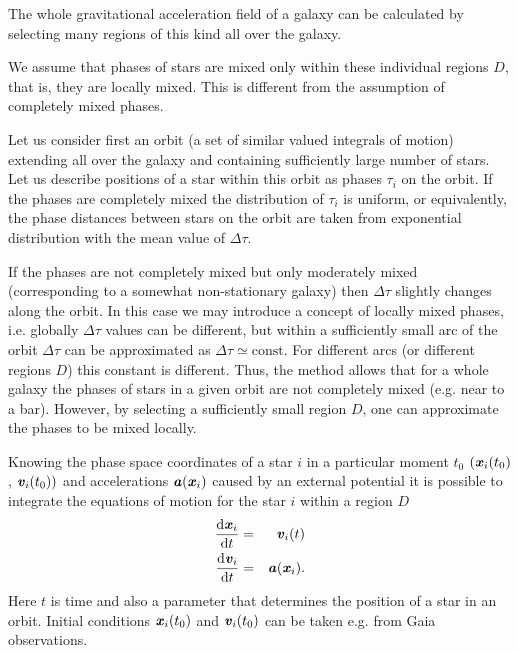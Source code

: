 \documentclass[fleqn,usenatbib]{mnras}
\begin{document}
The whole gravitational acceleration field of a galaxy can be calculated by selecting many regions of this kind all over the galaxy. 

We assume that phases of stars are mixed only within these individual regions $D$, that is, they are locally mixed. This is different from the assumption of completely mixed phases.

Let us consider first an orbit (a set of similar valued integrals of motion) extending all over the galaxy and containing sufficiently large number of stars. Let us describe positions of a star within this orbit as phases $\tau_i$ on the orbit. If the phases are completely mixed the distribution of $\tau_i$ is uniform, or equivalently, the phase distances between stars on the orbit are taken from exponential distribution with the mean value of $\Delta\tau$.

If the phases are not completely mixed but only moderately mixed (corresponding to a somewhat non-stationary galaxy) then $\Delta\tau$ slightly changes along the orbit. In this case we may introduce a concept of locally mixed phases, i.e. globally $\Delta\tau$ values can be different, but within a sufficiently small arc of the orbit $\Delta\tau$ can be approximated as $\Delta\tau \simeq \mathrm{const}$. For different arcs (or different regions $D$) this constant is different. Thus, the method allows that for a whole galaxy the phases of stars in a given orbit are not completely mixed (e.g. near to a bar). However, by selecting a sufficiently small region $D$, one can approximate the phases to be mixed locally.

Knowing the phase space coordinates of a star $i$ in a particular moment $t_0$ $(\textbf{\textit{x}}_i (t_0)$, $\textbf{\textit{v}}_i (t_0))$ and accelerations $\textbf{\textit{a}}(\textbf{\textit{x}}_i)$ caused by an external potential it is possible to integrate the equations of motion for the star $i$ within a region $D$  
\begin{eqnarray}
	\frac{\mathrm{d}\textbf{\textit{x}}_i}{\mathrm{d}t} & = & \textbf{\textit{v}}_i(t)\label{eq:liikumisvorrandid1} \\
	\frac{\text{d}\textbf{\textit{v}}_i}{\mathrm{d}t} & = &\textbf{\textit{a}} (\textbf{\textit{x}}_i).\label{eq:liikumisvorrandid2}
\end{eqnarray}
Here $t$ is time and also a parameter that determines the position of a star in an orbit. Initial conditions $\textbf{\textit{x}}_i (t_0)$ and $\textbf{\textit{v}}_i (t_0)$ can be taken e.g. from Gaia observations. 
\end{document}
